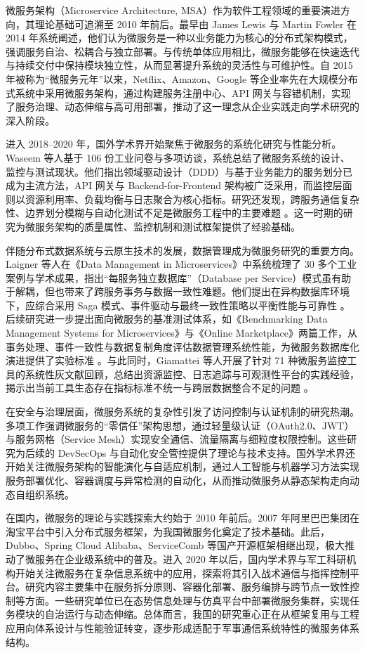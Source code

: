 微服务架构（Microservice Architecture, MSA）作为软件工程领域的重要演进方向，其理论基础可追溯至 2010 年前后。最早由 James Lewis 与 Martin Fowler 在 2014 年系统阐述，他们认为微服务是一种以业务能力为核心的分布式架构模式，强调服务自治、松耦合与独立部署。与传统单体应用相比，微服务能够在快速迭代与持续交付中保持模块独立性，从而显著提升系统的灵活性与可维护性。自 2015 年被称为“微服务元年”以来，Netflix、Amazon、Google 等企业率先在大规模分布式系统中采用微服务架构，通过构建服务注册中心、API 网关与容错机制，实现了服务治理、动态伸缩与高可用部署，推动了这一理念从企业实践走向学术研究的深入阶段。

进入 2018–2020 年，国外学术界开始聚焦于微服务的系统化研究与性能分析。Waseem 等人基于 106 份工业问卷与多项访谈，系统总结了微服务系统的设计、监控与测试现状。他们指出领域驱动设计（DDD）与基于业务能力的服务划分已成为主流方法，API 网关与 Backend-for-Frontend 架构被广泛采用，而监控层面则以资源利用率、负载均衡与日志聚合为核心指标。研究还发现，跨服务通信复杂性、边界划分模糊与自动化测试不足是微服务工程中的主要难题 \cite{Waseem2021Design}。这一时期的研究为微服务架构的质量属性、监控机制和测试框架提供了经验基础。

伴随分布式数据系统与云原生技术的发展，数据管理成为微服务研究的重要方向。Laigner 等人在《Data Management in Microservices》中系统梳理了 30 多个工业案例与学术成果，指出“每服务独立数据库”（Database per Service）模式虽有助于解耦，但也带来了跨服务事务与数据一致性难题。他们提出在异构数据库环境下，应综合采用 Saga 模式、事件驱动与最终一致性策略以平衡性能与可靠性 \cite{Laigner2021Data}。后续研究进一步提出面向微服务的基准测试体系，如《Benchmarking Data Management Systems for Microservices》与《Online Marketplace》两篇工作，从事务处理、事件一致性与数据复制角度评估数据管理系统性能，为微服务数据库化演进提供了实验标准 \cite{BenchmarkingDataMgmt2024,OnlineMarketplace2024}。与此同时，Giamattei 等人开展了针对 71 种微服务监控工具的系统性灰文献回顾，总结出资源监控、日志追踪与可观测性平台的实践经验，揭示出当前工具生态存在指标标准不统一与跨层数据整合不足的问题 \cite{MonitoringTools2023}。

在安全与治理层面，微服务系统的复杂性引发了访问控制与认证机制的研究热潮。多项工作强调微服务的“零信任”架构思想，通过轻量级认证（OAuth2.0、JWT）与服务网格（Service Mesh）实现安全通信、流量隔离与细粒度权限控制。这些研究为后续的 DevSecOps 与自动化安全管控提供了理论与技术支持。国外学术界还开始关注微服务架构的智能演化与自适应机制，通过人工智能与机器学习方法实现服务部署优化、容器调度与异常检测的自动化，从而推动微服务从静态架构走向动态自组织系统。

在国内，微服务的理论与实践探索大约始于 2010 年前后。2007 年阿里巴巴集团在淘宝平台中引入分布式服务框架，为我国微服务化奠定了技术基础。此后，Dubbo、Spring Cloud Alibaba、ServiceComb 等国产开源框架相继出现，极大推动了微服务在企业级系统中的普及。进入 2020 年以后，国内学术界与军工科研机构开始关注微服务在复杂信息系统中的应用，探索将其引入战术通信与指挥控制平台。研究内容主要集中在服务拆分原则、容器化部署、服务编排与跨节点一致性控制等方面。一些研究单位已在态势信息处理与仿真平台中部署微服务集群，实现任务模块的自治运行与动态伸缩。总体而言，我国的研究重心正在从框架复用与工程应用向体系设计与性能验证转变，逐步形成适配于军事通信系统特性的微服务体系结构。

